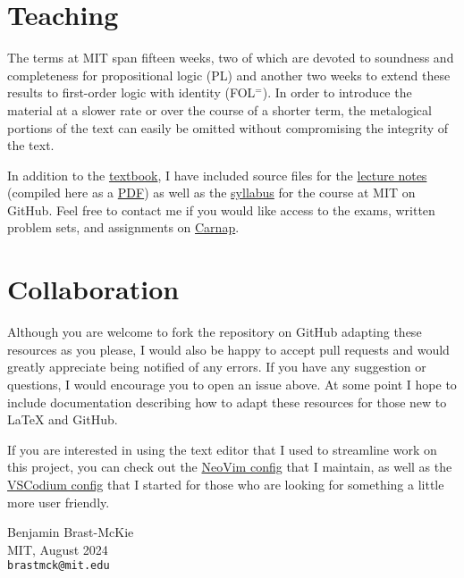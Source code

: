 \section*{Teaching}

The terms at MIT span fifteen weeks, two of which are devoted to soundness and completeness for propositional logic (PL) and another two weeks to extend these results to first-order logic with identity (FOL$^=$).
In order to introduce the material at a slower rate or over the course of a shorter term, the metalogical portions of the text can easily be omitted without compromising the integrity of the text.

In addition to the \href{https://github.com/benbrastmckie/ForAllX/tree/master/Book/Chapters}{textbook}, I have included source files for the \href{https://github.com/benbrastmckie/ForAllX/tree/master/Lectures}{lecture notes} (compiled here as a \href{https://github.com/benbrastmckie/ForAllX/blob/master/Handouts/All_Handouts.pdf}{PDF}) as well as the \href{https://github.com/benbrastmckie/ForAllX/blob/master/Syllabus/Syllabus.pdf}{syllabus} for the course at MIT on GitHub.
Feel free to contact me if you would like access to the exams, written problem sets, and assignments on \href{https://carnap.io/}{Carnap}.

\section*{Collaboration}

Although you are welcome to fork the repository on GitHub adapting these resources as you please, I would also be happy to accept pull requests and would greatly appreciate being notified of any errors.
If you have any suggestion or questions, I would encourage you to open an issue above.
At some point I hope to include documentation describing how to adapt these resources for those new to \LaTeX{} and GitHub.

If you are interested in using the text editor that I used to streamline work on this project, you can check out the \href{https://github.com/benbrastmckie/.config}{NeoVim config} that I maintain, as well as the \href{https://github.com/benbrastmckie/VSCodium}{VSCodium config} that I started for those who are looking for something a little more user friendly.

\begin{flushright}
\textsf{Benjamin Brast-McKie} \\
\textsf{MIT, August 2024} \\
\texttt{brastmck@mit.edu}
\end{flushright}

